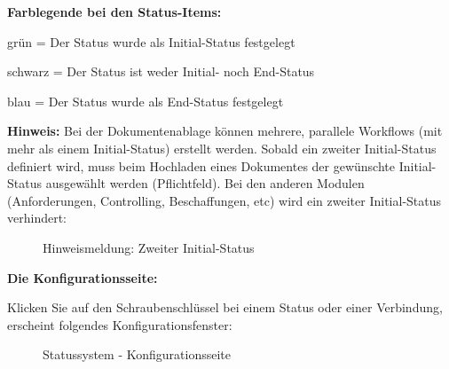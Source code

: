 \vspace{\baselineskip}

\textbf{Farblegende bei den Status-Items:}
\begin{compactitem}
	\item {\color{ForestGreen} grün} = Der Status wurde als Initial-Status festgelegt
	\item schwarz = Der Status ist weder Initial- noch End-Status
	\item {\color{ProcessBlue} blau} = Der Status wurde als End-Status festgelegt
\end{compactitem}

\pagebreak

\textbf{Hinweis:}
Bei der Dokumentenablage können mehrere, parallele Workflows (mit mehr als einem Initial-Status) erstellt werden. Sobald ein zweiter Initial-Status definiert wird, muss beim Hochladen eines Dokumentes der gewünschte Initial-Status ausgewählt werden (Pflichtfeld). Bei den anderen Modulen (Anforderungen, Controlling, Beschaffungen, etc) wird ein zweiter Initial-Status verhindert:

\begin{figure}[H]
\caption{Hinweismeldung: Zweiter Initial-Status}
\end{figure}

\textbf{Die Konfigurationsseite:}

Klicken Sie auf den Schraubenschlüssel  bei einem Status oder einer Verbindung, erscheint folgendes Konfigurationsfenster:

\begin{figure}[H]
\caption{Statussystem - Konfigurationsseite}
\end{figure}

